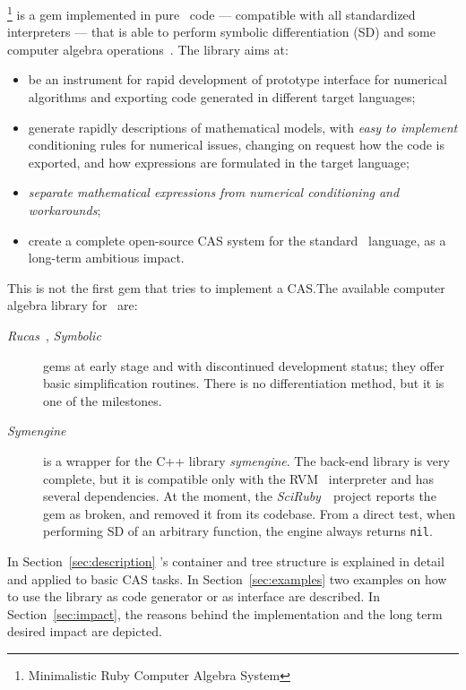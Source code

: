 \ragnicas\footnote{Minimalistic Ruby Computer Algebra System} is a gem implemented in pure \Ruby~code --- compatible with all standardized interpreters --- that is able to perform symbolic differentiation (SD) and some computer algebra operations~\cite{von2013modern}. The library aims at:
\begin{itemize}
  \item be an instrument for rapid development of prototype interface for numerical algorithms and exporting code generated in different target languages;
  \item generate rapidly descriptions of mathematical models, with \emph{easy to implement} conditioning rules for numerical issues, changing on request how the code is exported, and how expressions are formulated in the target language;
  \item \emph{separate mathematical expressions from numerical conditioning and workarounds};
  \item create a complete open-source CAS system for the standard \Ruby~language, as a long-term ambitious impact.
\end{itemize}

This is not the first gem that tries to implement a CAS.\@ The available computer algebra library for \Ruby~are:
\begin{description}
  \item [\emph{Rucas}~\cite{rucas}, \emph{Symbolic}~\cite{symbolic}] gems at early stage and with discontinued development status; they offer basic simplification routines. There is no differentiation method, but it is one of the milestones.
  \item [\emph{Symengine}~\cite{symengine}] is a wrapper for the C++ library \emph{symengine}. The back-end library is very complete, but it is compatible only with the RVM \Ruby~interpreter and has several dependencies. At the moment, the \emph{SciRuby}~\cite{sciruby}~project reports the gem as broken, and removed it from its codebase. From a direct test, when performing SD of an arbitrary function, the engine always returns \texttt{nil}.
\end{description}

In Section~\ref{sec:description} \ragnicas's container and tree structure is explained in detail and applied to basic CAS tasks. In Section~\ref{sec:examples} two examples on how to use the library as code generator or as interface are described. In Section~\ref{sec:impact}, the reasons behind the implementation and the long term desired impact are depicted.
